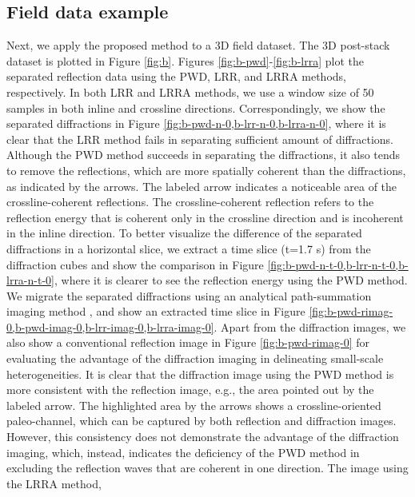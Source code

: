 \subsection{Field data example}
Next, we apply the proposed method to a 3D field dataset.   The 3D post-stack dataset is plotted in Figure \ref{fig:b}. Figures \ref{fig:b-pwd}-\ref{fig:b-lrra} plot the separated reflection data using the PWD, LRR, and LRRA methods, respectively. In both LRR and LRRA methods, we use a window size of 50 samples in both inline and crossline directions.  Correspondingly, we show the separated diffractions in Figure \ref{fig:b-pwd-n-0,b-lrr-n-0,b-lrra-n-0}, where it is clear that the LRR method fails in separating sufficient amount of diffractions.  Although the PWD method succeeds in separating the diffractions, it also tends to remove the reflections, which are more spatially coherent than the diffractions, as indicated by the arrows. The labeled arrow indicates a noticeable area of the crossline-coherent reflections. The crossline-coherent reflection refers to the reflection energy that is coherent only in the crossline direction and is incoherent in the inline direction. To better visualize the difference of the separated diffractions in a horizontal slice, we extract a time slice (t=1.7 s) from the diffraction cubes and show the comparison in Figure \ref{fig:b-pwd-n-t-0,b-lrr-n-t-0,b-lrra-n-t-0}, where it is clearer to see the reflection energy using the PWD method. We migrate the separated diffractions using an analytical path-summation imaging method \cite[]{merzlikin2017analytical}, and show an extracted time slice in Figure \ref{fig:b-pwd-rimag-0,b-pwd-imag-0,b-lrr-imag-0,b-lrra-imag-0}. Apart from the diffraction images, we also show a conventional reflection image in Figure \ref{fig:b-pwd-rimag-0} for evaluating the advantage of the diffraction imaging in delineating small-scale heterogeneities. It is clear that the diffraction image using the PWD method is more consistent with the reflection image, e.g., the area pointed out by the labeled arrow. The highlighted area by the arrows shows a crossline-oriented paleo-channel, which can be captured by both reflection and diffraction images. However, this consistency does not demonstrate the advantage of the diffraction imaging, which, instead, indicates the deficiency of the PWD method in excluding the reflection waves that are coherent in one direction. The image using the LRRA method, 